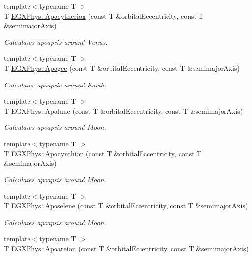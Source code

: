 \begin{DoxyCompactItemize}
{\footnotesize template$<$typename T $>$ }\\T \mbox{\hyperlink{group___e_g_x_phys-_apoapsis_ga59a284bb0bc11848c5b9ef1283033425}{E\+G\+X\+Phys\+::\+Apocytherion}} (const T \&orbital\+Eccentricity, const T \&semimajor\+Axis)
\begin{DoxyCompactList}\small\item\em Calculates apoapsis around Venus. \end{DoxyCompactList}\item 
{\footnotesize template$<$typename T $>$ }\\T \mbox{\hyperlink{group___e_g_x_phys-_apoapsis_ga5cf587a051db28cae9e028a2b4955b0d}{E\+G\+X\+Phys\+::\+Apogee}} (const T \&orbital\+Eccentricity, const T \&semimajor\+Axis)
\begin{DoxyCompactList}\small\item\em Calculates apoapsis around Earth. \end{DoxyCompactList}\item 
{\footnotesize template$<$typename T $>$ }\\T \mbox{\hyperlink{group___e_g_x_phys-_apoapsis_gacc68b49812c38394611e1ef3a8bf0e3e}{E\+G\+X\+Phys\+::\+Apolune}} (const T \&orbital\+Eccentricity, const T \&semimajor\+Axis)
\begin{DoxyCompactList}\small\item\em Calculates apoapsis around Moon. \end{DoxyCompactList}\item 
{\footnotesize template$<$typename T $>$ }\\T \mbox{\hyperlink{group___e_g_x_phys-_apoapsis_ga557bb4d1a0ce7f17aaa8f8de469d4f52}{E\+G\+X\+Phys\+::\+Apocynthion}} (const T \&orbital\+Eccentricity, const T \&semimajor\+Axis)
\begin{DoxyCompactList}\small\item\em Calculates apoapsis around Moon. \end{DoxyCompactList}\item 
{\footnotesize template$<$typename T $>$ }\\T \mbox{\hyperlink{group___e_g_x_phys-_apoapsis_gab61f3b2d6a5be3f62f5fb6dfdf802014}{E\+G\+X\+Phys\+::\+Aposelene}} (const T \&orbital\+Eccentricity, const T \&semimajor\+Axis)
\begin{DoxyCompactList}\small\item\em Calculates apoapsis around Moon. \end{DoxyCompactList}\item 
{\footnotesize template$<$typename T $>$ }\\T \mbox{\hyperlink{group___e_g_x_phys-_apoapsis_ga8d8ac5814f653e229e1d463b432ffca5}{E\+G\+X\+Phys\+::\+Apoareion}} (const T \&orbital\+Eccentricity, const T \&semimajor\+Axis)

\end{DoxyCompactItemize}
